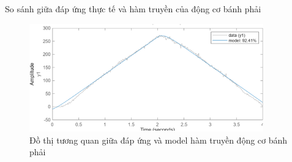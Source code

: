                \hspace*{0.6cm}So sánh giữa đáp ứng thực tế và hàm truyền của động cơ bánh phải
               \begin{figure}[H]
                    \centering
                    \includegraphics[width=0.9\textwidth]{pictures/chapter5/CJGB1_compare.png}
                    \caption{Đồ thị tương quan giữa đáp ứng và model hàm truyền động cơ bánh phải}
                    \label{CJGB1_compare}
               \end{figure} 
